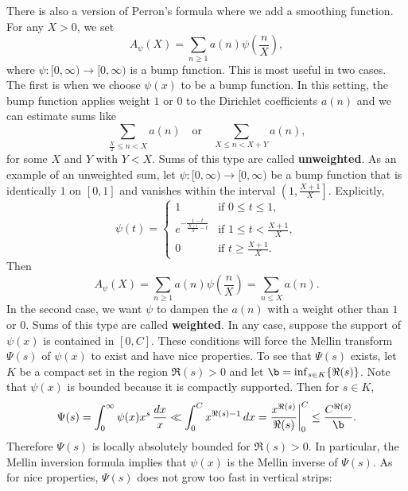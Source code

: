     There is also a version of Perron's formula where we add a smoothing function. For any $X > 0$, we set
    \[
      A_{\psi}(X) = \sum_{n \ge 1}a(n)\psi\left(\frac{n}{X}\right),
    \]
    where $\psi:[0,\infty) \to [0,\infty)$ is a bump function. This is most useful in two cases. The first is when we choose $\psi(x)$ to be a bump function. In this setting, the bump function applies weight $1$ or $0$ to the Dirichlet coefficients $a(n)$ and we can estimate sums like
    \[
      \sum_{\frac{X}{2} \le n < X}a(n) \quad \text{or} \quad \sum_{X \le n < X+Y}a(n),
    \]
    for some $X$ and $Y$ with $Y < X$. Sums of this type are called \textbf{unweighted}. As an example of an unweighted sum, let $\psi:[0,\infty) \to [0,\infty)$ be a bump function that is identically $1$ on $[0,1]$ and vanishes within the interval $\left(1,\frac{X+1}{X}\right]$. Explicitly,
    \[
      \psi(t) = \begin{cases} 1 & \text{if $0 \le t \le 1$}, \\ e^{-\frac{1-t}{\frac{X+1}{X}-t}} & \text{if $1 \le t < \frac{X+1}{X}$}, \\ 0 & \text{if $t \ge \frac{X+1}{X}$}. \end{cases}
    \]
    Then 
    \[
      A_{\psi}(X) = \sum_{n \ge 1}a(n)\psi\left(\frac{n}{X}\right) = \sum_{n \le X}a(n).
    \]
    In the second case, we want $\psi$ to dampen the $a(n)$ with a weight other than $1$ or $0$. Sums of this type are called \textbf{weighted}. In any case, suppose the support of $\psi(x)$ is contained in $[0,C]$. These conditions will force the Mellin transform $\Psi(s)$ of $\psi(x)$ to exist and have nice properties. To see that $\Psi(s)$ exists, let $K$ be a compact set in the region $\Re(s) > 0$ and let $\b = \inf_{s \in K}\{\Re(s)\}$. Note that $\psi(x)$ is bounded because it is compactly supported. Then for $s \in K$,
    \[
      \Psi(s) = \int_{0}^{\infty}\psi(x)x^{s}\,\frac{dx}{x} \ll \int_{0}^{C}x^{\Re(s)-1}\,dx = \frac{x^{\Re(s)}}{\Re(s)}\bigg|_{0}^{C} \le \frac{C^{\Re(s)}}{\b}.
    \]
    Therefore $\Psi(s)$ is locally absolutely bounded for $\Re(s) > 0$. In particular, the Mellin inversion formula implies that $\psi(x)$ is the Mellin inverse of $\Psi(s)$. As for nice properties, $\Psi(s)$ does not grow too fast in vertical strips:

